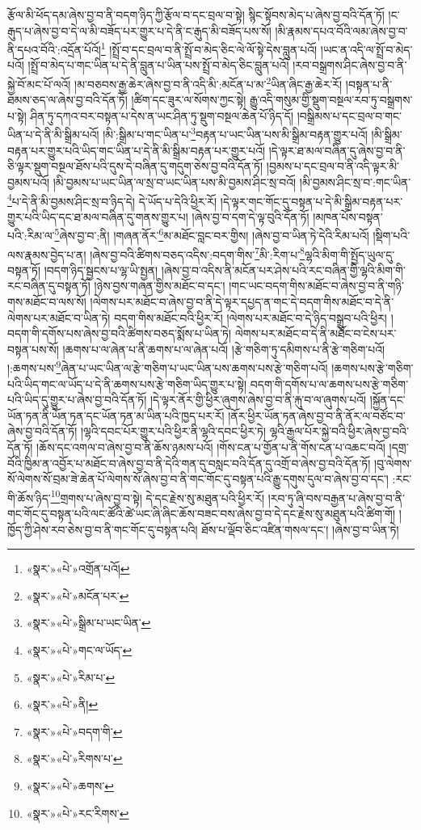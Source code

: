 རྩོལ་མི་ཕོད་དམ་ཞེས་བྱ་བ་ནི་བདག་ཉིད་ཀྱི་རྩོལ་བ་དང་བྲལ་བ་སྟེ། སྙིང་སྟོབས་མེད་པ་ཞེས་བྱ་བའི་དོན་ཏོ། །ང་རྒུད་པ་ཞེས་བྱ་བ་དེ་ལ་མི་བཟོད་པར་གྱུར་པ་དེ་ནི་ང་རྒུད་མི་བཟོད་པས་སོ། །མི་རྣམས་དཔའ་བོའི་ལམ་ཞེས་བྱ་བ་ནི་དཔའ་བོའི་:འདྲོན་པོའོ།\footnote{«སྣར་»«པེ་»འགྲོན་པའོ།} །སྤྲོ་བ་དང་བྲལ་བ་ནི་སྤྲོ་བ་མེད་ཅིང་ལེ་ལོ་སྟེ་དེས་བླུན་པའོ། །ཡང་ན་འདི་ལ་སྤྲོ་བ་མེད་པའོ། །སྤྲོ་བ་མེད་པ་གང་ཡིན་པ་དེ་ནི་བླུན་པ་ཡིན་པས་སྤྲོ་བ་མེད་ཅིང་བླུན་པའོ། །རབ་བསྒྲགས་ཤིང་ཞེས་བྱ་བ་ནི་སྐྱེ་བོ་མང་པོ་ལའོ། །མ་བཅབས་རྒྱ་ཆེར་ཞེས་བྱ་བ་ནི་འདི་མི་:མངོན་པ་མ་\footnote{«སྣར་»«པེ་»མངོན་པར་}ཡིན་ཞིང་རྒྱ་ཆེར་རོ། །བསྟན་པ་ནི་ཐམས་ཅད་ལ་ཞེས་བྱ་བའི་དོན་ཏོ། །ཚིག་དང་ཟུར་ལ་སོགས་ཀྱང་སྟེ། རྒྱུ་འདི་གསུམ་གྱི་སྡུག་བསྔལ་རབ་ཏུ་བསྒྲགས་པ་སྟེ། ཤིན་ཏུ་དཀའ་བར་བསྟན་པ་དེས་ན་ཡང་ཤིན་ཏུ་སྡུག་བསྔལ་ཆེན་པོ་ཉིད་དོ། །བསྒྲིམས་པ་དང་བྲལ་བ་གང་ཡིན་པ་དེ་ནི་མི་སྒྲིམ་པའོ། །མི་:སྒྲིམ་པ་གང་ཡིན་པ་\footnote{«སྣར་»«པེ་»སྒྲིམ་པ་ཡང་ཡིན་}བརྟན་པ་ཡང་ཡིན་པས་མི་སྒྲིམ་བརྟན་གྱུར་པའོ། །མི་སྒྲིམ་བརྟན་པར་གྱུར་པའི་ཡིད་གང་ཡིན་པ་དེ་ནི་མི་སྒྲིམ་བརྟན་པར་གྱུར་པའོ། །དེ་ལྟར་ཐ་མལ་བཞིན་དུ་ཞེས་བྱ་བ་ནི་ཅི་ལྟར་སྡུག་བསྔལ་ཐོས་པའི་དུས་དེ་བཞིན་དུ་གདུག་ཅེས་བྱ་བའི་དོན་ཏོ། །བྱམས་པ་དང་བྲལ་བ་ནི་འདི་ལྟར་མི་བྱམས་པའོ། །མི་བྱམས་པ་ཡང་ཡིན་ལ་སྲ་བ་ཡང་ཡིན་པས་མི་བྱམས་ཤིང་སྲ་བའོ། །མི་བྱམས་ཤིང་སྲ་བ་:གང་ཡིན་\footnote{«སྣར་»«པེ་»གང་ལ་ཡོད་}པ་དེ་ནི་མི་བྱམས་ཤིང་སྲ་བ་ཉིད་དེ། དེ་ཡོད་པ་དེའི་ཕྱིར་རོ། །དེ་ལྟར་གང་གོང་དུ་བསྟན་པ་དེ་མི་སྒྲིམ་བརྟན་པར་གྱུར་པའི་ཡིད་དང་ཐ་མལ་བཞིན་དུ་གནས་གྱུར་པ། །ཞེས་བྱ་བ་དག་དེ་ལྟ་བུའི་དོན་ཏོ། །མཁན་པོས་བསྟན་པའི་:རིམ་ལ་\footnote{«སྣར་»«པེ་»རིམ་པ་}ཞེས་བྱ་བ་:ནི། །གཞན་ནོར་\footnote{«སྣར་»«པེ་»ནི། }མ་མཐོང་བླང་བར་གྱིས། །ཞེས་བྱ་བ་ཡིན་ཏེ་དེའི་རིམ་པའོ། །སྡིག་པའི་ལས་རྣམས་བྱེད་པ་ན། །ཞེས་བྱ་བའི་ཚིགས་བཅད་འདིས་:བདག་གིས་\footnote{«སྣར་»«པེ་»བདག་གི་}མི་:རིག་པ་\footnote{«སྣར་»«པེ་»རིགས་པ་}ལྷའི་མིག་གི་སྤྱོད་ཡུལ་དུ་བསྟན་ཏོ། །བདག་ཉིད་སྦྱངས་པ་ལྷ་ཡི་སྤྱན། །ཞེས་བྱ་བ་འདིས་ནི་མངོན་པར་ཤེས་པའི་རང་བཞིན་གྱི་ལྷའི་མིག་གི་རང་བཞིན་དུ་བསྟན་ཏོ། །ཉེས་བྱས་གཞན་གྱིས་མཐོང་བ་དང་། །གང་ཡང་བདག་གིས་མཐོང་བ་ཞེས་བྱ་བ་ནི་གཉི་གས་མཐོང་བ་ལས་སོ། །ལེགས་པར་མཐོང་བ་ཞེས་བྱ་བ་ནི་དེ་ལྟར་དཔྱད་ན་གང་དེ་བདག་གིས་མཐོང་བ་དེ་ནི་ལེགས་པར་མཐོང་བ་ཡིན་ཏེ། བདག་གིས་མཐོང་བའི་ཕྱིར་རོ། །ལེགས་པར་མཐོང་བ་དེ་ཉིད་བསྒྲུབ་པའི་ཕྱིར། །བདག་གི་དགོས་པས་ཞེས་བྱ་བའི་ཚིགས་བཅད་སྨོས་པ་ཡིན་ཏེ། ལེགས་པར་མཐོང་བ་དེ་ནི་མཐོང་བ་ངེས་པར་བསྟན་པས་སོ། །ཆགས་པ་ལ་ཞེན་པ་ནི་ཆགས་པ་ལ་ཞེན་པའོ། །རྩེ་གཅིག་ཏུ་དམིགས་པ་ནི་རྩེ་གཅིག་པའོ། །:ཆགས་པས་\footnote{«སྣར་»«པེ་»ཆགས་}ཞེན་པ་ཡང་ཡིན་ལ་རྩེ་གཅིག་པ་ཡང་ཡིན་པས་ཆགས་པས་རྩེ་གཅིག་པའོ། །ཆགས་པས་རྩེ་གཅིག་པའི་ཡིད་གང་ལ་ཡོད་པ་དེ་ནི་ཆགས་པས་རྩེ་གཅིག་ཡིད་གྱུར་པ་སྟེ། བདག་གི་དགོས་པ་ལ་ཆགས་པས་རྩེ་གཅིག་པའི་ཡིད་དུ་གྱུར་པ་ཞེས་བྱ་བའི་དོན་ཏོ། །དེ་ལྟར་ནོར་གྱི་ཕྱིར་ཞུགས་ཞེས་བྱ་བ་ནི་རྐུ་བ་ལ་ཞུགས་པའོ། །སྐྱོན་དང་ཡོན་ཏན་ནི་ཡོན་ཏན་དང་ཡོན་ཏན་མ་ཡིན་པའི་ཁྱད་པར་རོ། །ནོར་ཕྱིར་ཡོན་ཏན་ཞེས་བྱ་བ་ནི་ནོར་ལ་བཙོང་བ་ཞེས་བྱ་བའི་དོན་ཏོ། །ལྷའི་དབང་པོར་གྱུར་པའི་ཕྱིར་ནི་ལྷའི་དབང་ཕྱིར་ཏེ། ལྷའི་རྒྱལ་པོར་སྐྱེ་བའི་ཕྱིར་ཞེས་བྱ་བའི་དོན་ཏོ། །ཆོས་དང་འགལ་བ་ཞེས་བྱ་བ་ནི་ཆོས་ཉམས་པའོ། །གོས་ངན་པ་གྱོན་པ་ནི་གོས་ངན་པ་འཆང་བའོ། །དགྲ་བོའི་ཁྱིམ་ན་འབྱོར་པ་མཐོང་བ་ཞེས་བྱ་བ་ནི་དེའི་གན་དུ་བསླང་བའི་དོན་དུ་འགྲོ་བ་ཞེས་བྱ་བའི་དོན་ཏོ། །བུ་ལེགས་སོ་ལེགས་སོ་བྲམ་ཟེ་ཆེན་པོ་ལེགས་སོ་ཞེས་བྱ་བ་ནི་གང་གོང་དུ་བསྟན་པའི་རྒྱུ་དགུས་དུལ་བ་ཞེས་བྱ་བ་དང་། :རང་གི་ཆོས་ཉིད་\footnote{«སྣར་»«པེ་»རང་རིགས་}གྲགས་པ་ཞེས་བྱ་བ་སྟེ། དེ་དང་རྗེས་སུ་མཐུན་པའི་ཕྱིར་རོ། །རབ་ཏུ་ཞི་བས་བརྒྱན་པ་ཞེས་བྱ་བ་ནི་གང་གོང་དུ་བསྟན་པའི་ལང་ཚོའི་ཚེ་ཡང་ཞི་ཞིང་ཆོས་བཟང་བས་ཞེས་བྱ་བ་དེ་དང་རྗེས་སུ་མཐུན་པའི་ཚིག་གོ། །ཁྱོད་ཀྱི་ཤེས་རབ་ཅེས་བྱ་བ་ནི་གང་གོང་དུ་བསྟན་པའི། ཐོས་པ་ལྡོབ་ཅིང་འཛིན་གསལ་དང་། །ཞེས་བྱ་བ་ཡིན་ཏེ། 